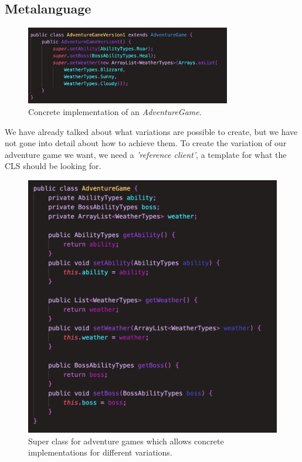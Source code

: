 \subsection{Metalanguage} \label{Metalanguage}
\begin{figure}[H]
	\centering
	\includegraphics[width=0.8\textwidth]{Materials/Adventuregame/Version1}
	\caption{Concrete implementation of an \textit{AdventureGame}.}
	\label{ConcreteVariation}
\end{figure}

We have already talked about what variations are possible to create, but we have not gone into detail about how to achieve them. To create the variation of our adventure game we want, we need a \textit{'reference client'}, a template for what the CLS should be looking for.
\begin{figure}
	\vspace{-10px}
	\centering
	\includegraphics[width=\linewidth]{Materials/Adventuregame/AdventureGame}
	\caption{Super class for adventure games which allows concrete implementations for different variations.}
	\label{MetalanguageAdventure}
\end{figure} 

